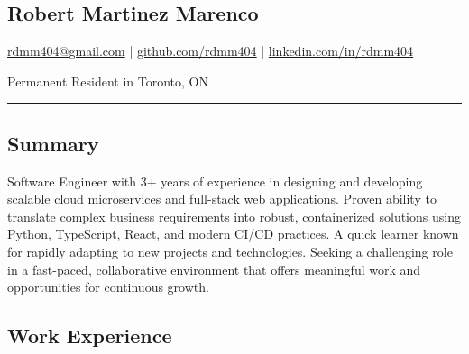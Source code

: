 \documentclass[a4paper,10pt]{article}
\begin{document}
\pagestyle{empty}

\begin{center}
  \section*{\LARGE Robert Martinez Marenco}
  \href{mailto:rdmm404@gmail.com}{rdmm404@gmail.com} |
  \href{https://github.com/rdmm404}{github.com/rdmm404} |
  \href{https://linkedin.com/in/rdmm404}{linkedin.com/in/rdmm404}

  Permanent Resident in Toronto, ON
\end{center}

\hrule
\vspace{4pt}

\subsection*{Summary}
Software Engineer with 3+ years of experience in designing and developing scalable
cloud microservices and full-stack web applications. Proven ability to translate
complex business requirements into robust, containerized solutions using
Python, TypeScript, React, and modern CI/CD practices. A quick learner known for rapidly
adapting to new projects and technologies. Seeking a challenging role in a fast-paced,
collaborative environment that offers meaningful work and opportunities for continuous growth.
\subsection*{Work Experience}
\end{document}
